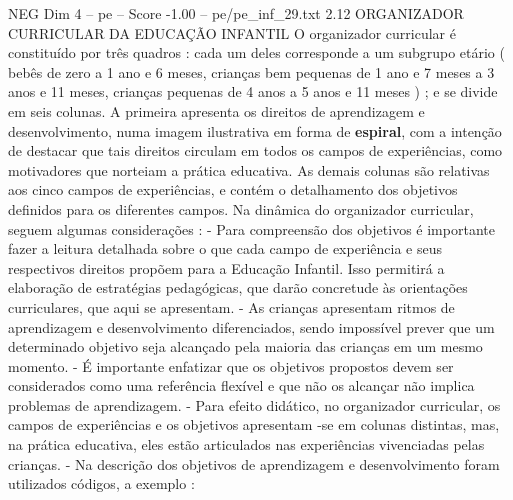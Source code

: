 \begin{textsample}{NEG Dim 4 – pe – Score -1.00 – pe/pe\_inf\_29.txt}  \label{ex:f4_neg_020}
2.12 ORGANIZADOR CURRICULAR DA EDUCAÇÃO INFANTIL O organizador curricular é constituído por três quadros : cada um deles corresponde a um subgrupo etário ( bebês de zero a 1 ano e 6 meses, crianças bem pequenas de 1 ano e 7 meses a 3 anos e 11 meses, crianças pequenas de 4 anos a 5 anos e 11 meses ) ; e se divide em seis colunas.
A primeira apresenta os direitos de aprendizagem e desenvolvimento, numa imagem ilustrativa em forma de \textbf{espiral}, com a intenção de destacar que tais direitos circulam em todos os campos de experiências, como motivadores que norteiam a prática educativa.
As demais colunas são relativas aos cinco campos de experiências, e contém o detalhamento dos objetivos definidos para os diferentes campos.
Na dinâmica do organizador curricular, seguem algumas considerações : - Para compreensão dos objetivos é importante fazer a leitura detalhada sobre o que cada campo de experiência e seus respectivos direitos propõem para a Educação Infantil.
Isso permitirá a elaboração de estratégias pedagógicas, que darão concretude às orientações curriculares, que aqui se apresentam. - As crianças apresentam ritmos de aprendizagem e desenvolvimento diferenciados, sendo impossível prever que um determinado objetivo seja alcançado pela maioria das crianças em um mesmo momento. - É importante enfatizar que os objetivos propostos devem ser considerados como uma referência flexível e que não os alcançar não implica problemas de aprendizagem. - Para efeito didático, no organizador curricular, os campos de experiências e os objetivos apresentam -se em colunas distintas, mas, na prática educativa, eles estão articulados nas experiências vivenciadas pelas crianças. - Na descrição dos objetivos de aprendizagem e desenvolvimento foram utilizados códigos, a exemplo :

\end{textsample}

